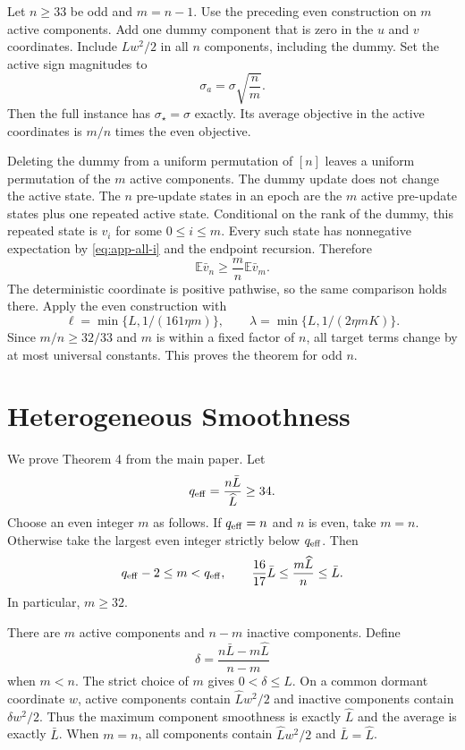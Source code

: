 \documentclass[twoside]{article}
\newcommand{\E}{\mathbb E}
\begin{document}
Let $n\ge33$ be odd and $m=n-1$. Use the preceding even construction on
$m$ active components. Add one dummy component that is zero in the $u$ and
$v$ coordinates. Include $Lw^2/2$ in all $n$ components, including the dummy.
Set the active sign magnitudes to
\begin{equation}
 \sigma_a=\sigma\sqrt{\frac nm}.
\end{equation}
Then the full instance has $\sigma_\star=\sigma$ exactly. Its average
objective in the active coordinates is $m/n$ times the even objective.

Deleting the dummy from a uniform permutation of $[n]$ leaves a uniform
permutation of the $m$ active components. The dummy update does not change
the active state. The $n$ pre-update states in an epoch are the $m$ active
pre-update states plus one repeated active state. Conditional on the rank of
the dummy, this repeated state is $v_i$ for some $0\le i\le m$. Every such
state has nonnegative expectation by \eqref{eq:app-all-i} and the endpoint
recursion. Therefore
\begin{equation}
 \E\bar v_{n}\ge\frac mn\E\bar v_m.
\end{equation}
The deterministic coordinate is positive pathwise, so the same comparison
holds there. Apply the even construction with
\begin{equation}
 \ell=\min\{L,1/(161\eta m)\},
 \qquad \lambda=\min\{L,1/(2\eta mK)\}.
\end{equation}
Since $m/n\ge32/33$ and $m$ is within a fixed factor of $n$, all target terms
change by at most universal constants. This proves the theorem for odd $n$.

\section{Heterogeneous Smoothness}
\label{app:heterogeneous}

We prove Theorem 4 from the main paper. Let
\[
 q_{\rm eff}=\frac{n\bar L}{\widehat L}\ge34.
\]
Choose an even integer $m$ as follows. If $q_{\rm eff}=n$ and $n$ is even,
take $m=n$. Otherwise take the largest even integer strictly below
$q_{\rm eff}$. Then
\begin{equation}
 q_{\rm eff}-2\le m<q_{\rm eff},
 \qquad
 \frac{16}{17}\bar L
 \le\frac{m\widehat L}{n}\le\bar L.                 \label{eq:app-m-choice}
\end{equation}
In particular, $m\ge32$.

There are $m$ active components and $n-m$ inactive components. Define
\begin{equation}
 \delta=\frac{n\bar L-m\widehat L}{n-m}              \label{eq:app-delta}
\end{equation}
when $m<n$. The strict choice of $m$ gives $0<\delta\le\widehat L$. On a
common dormant coordinate $w$, active components contain
$\widehat Lw^2/2$ and inactive components contain $\delta w^2/2$. Thus the
maximum component smoothness is exactly $\widehat L$ and the average is
exactly $\bar L$. When $m=n$, all components contain
$\widehat Lw^2/2$ and $\bar L=\widehat L$.
\end{document}
